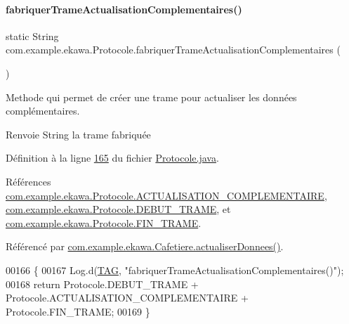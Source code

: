 \paragraph{\texorpdfstring{fabriquer\+Trame\+Actualisation\+Complementaires()}{fabriquerTrameActualisationComplementaires()}}
{\footnotesize\ttfamily static String com.\+example.\+ekawa.\+Protocole.\+fabriquer\+Trame\+Actualisation\+Complementaires (\begin{DoxyParamCaption}{ }\end{DoxyParamCaption})\hspace{0.3cm}{\ttfamily [static]}}



Methode qui permet de créer une trame pour actualiser les données complémentaires. 

\begin{DoxyReturn}{Renvoie}
String la trame fabriquée 
\end{DoxyReturn}


Définition à la ligne \hyperlink{_protocole_8java_source_l00165}{165} du fichier \hyperlink{_protocole_8java_source}{Protocole.\+java}.



Références \hyperlink{_protocole_8java_source_l00036}{com.\+example.\+ekawa.\+Protocole.\+A\+C\+T\+U\+A\+L\+I\+S\+A\+T\+I\+O\+N\+\_\+\+C\+O\+M\+P\+L\+E\+M\+E\+N\+T\+A\+I\+RE}, \hyperlink{_protocole_8java_source_l00025}{com.\+example.\+ekawa.\+Protocole.\+D\+E\+B\+U\+T\+\_\+\+T\+R\+A\+ME}, et \hyperlink{_protocole_8java_source_l00026}{com.\+example.\+ekawa.\+Protocole.\+F\+I\+N\+\_\+\+T\+R\+A\+ME}.



Référencé par \hyperlink{_cafetiere_8java_source_l00495}{com.\+example.\+ekawa.\+Cafetiere.\+actualiser\+Donnees()}.


\begin{DoxyCode}
00166     \{
00167         Log.d(\hyperlink{classcom_1_1example_1_1ekawa_1_1_protocole_ae9b68fa0daac528421b887f19413f8f5}{TAG}, \textcolor{stringliteral}{"fabriquerTrameActualisationComplementaires()"});
00168         \textcolor{keywordflow}{return} Protocole.DEBUT\_TRAME + Protocole.ACTUALISATION\_COMPLEMENTAIRE + Protocole.FIN\_TRAME;
00169     \}
\end{DoxyCode}
\mbox{\label{classcom_1_1example_1_1ekawa_1_1_protocole_aec8d32eecd3d497bc6c3d94c6e29450c}} 

